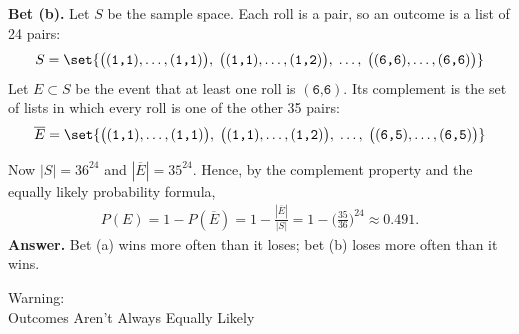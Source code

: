\documentclass[10pt]{beamer}
\begin{document}
\begin{frame}
\small
\begin{mybluebox}[title=\text{Example: The Gambler's Puzzle (de Méré, 1654), continued}]
\textbf{Bet (b).}
%
Let $S$ be the sample space.  Each roll is a pair, so an outcome is a list of 24 pairs:
\[ S=\set{\big((\texttt{1,1}), \hdots, (\texttt{1,1})\big), \;  \big((\texttt{1,1}), \hdots, (\texttt{1,2})\big), \; \hdots, \; \big((\texttt{6,6}), \hdots, (\texttt{6,6})\big)} \]
Let $E \subset S$ be the event that at least one roll is $(\texttt{6,6})$.  Its complement is the set of lists in which every roll is one of the other 35 pairs:
\[ \overline{E}=\set{\big((\texttt{1,1}), \hdots, (\texttt{1,1})\big), \;  \big((\texttt{1,1}), \hdots, (\texttt{1,2})\big), \; \hdots, \; \big((\texttt{6,5}), \hdots, (\texttt{6,5})\big)} \]

%
Now $|S|=36^{24}$ and $|\overline{E}|=35^{24}$.
%
Hence, by the complement property and the equally likely probability formula,
\begin{align*}
P(E) = 1 - P(\overline{E}) = 1 - \frac{|\overline{E}|}{|S|} = 1 - \bigg(\frac{35}{36}\bigg)^{24} \approx 0.491.
\end{align*}
\textbf{Answer.} Bet (a) wins more often than it loses; bet (b) loses more often than it wins.
\end{mybluebox}
\end{frame}





\begin{frame}[standout]
Warning: \\
Outcomes Aren't Always Equally Likely
\end{frame}
\end{document}
